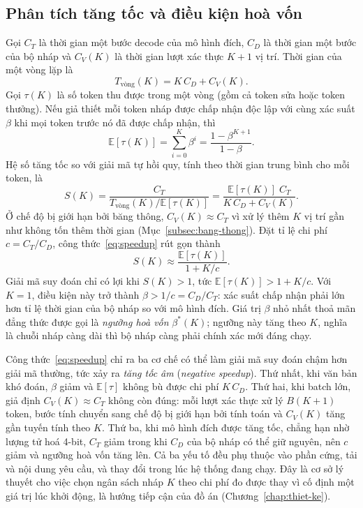 \subsection{Phân tích tăng tốc và điều kiện hoà vốn}
\label{subsec:phan-tich-tang-toc}

Gọi $C_T$ là thời gian một bước decode của mô hình đích, $C_D$ là thời gian một bước của bộ nháp và $C_V(K)$ là thời gian lượt xác thực $K+1$ vị trí. Thời gian của một vòng lặp là
\begin{equation}\label{eq:thoi-gian-vong}
  T_{\text{vòng}}(K) = K\,C_D + C_V(K).
\end{equation}
Gọi $\tau(K)$ là số token thu được trong một vòng (gồm cả token sửa hoặc token thưởng). Nếu giả thiết mỗi token nháp được chấp nhận độc lập với cùng xác suất $\beta$ khi mọi token trước nó đã được chấp nhận, thì~\cite{leviathan2023speculative}
\begin{equation}\label{eq:tau-ky-vong}
  \mathbb{E}[\tau(K)] = \sum_{i=0}^{K}\beta^{i} = \frac{1-\beta^{K+1}}{1-\beta}.
\end{equation}
Hệ số tăng tốc so với giải mã tự hồi quy, tính theo thời gian trung bình cho mỗi token, là
\begin{equation}\label{eq:speedup}
  S(K) = \frac{C_T}{T_{\text{vòng}}(K)/\mathbb{E}[\tau(K)]} = \frac{\mathbb{E}[\tau(K)]\; C_T}{K\,C_D + C_V(K)}.
\end{equation}
Ở chế độ bị giới hạn bởi băng thông, $C_V(K) \approx C_T$ vì xử lý thêm $K$ vị trí gần như không tốn thêm thời gian (Mục~\ref{subsec:bang-thong}). Đặt tỉ lệ chi phí $c = C_T/C_D$, công thức~\eqref{eq:speedup} rút gọn thành
\begin{equation}\label{eq:speedup-gon}
  S(K) \approx \frac{\mathbb{E}[\tau(K)]}{1 + K/c}.
\end{equation}
Giải mã suy đoán chỉ có lợi khi $S(K) > 1$, tức $\mathbb{E}[\tau(K)] > 1 + K/c$. Với $K=1$, điều kiện này trở thành $\beta > 1/c = C_D/C_T$: xác suất chấp nhận phải lớn hơn tỉ lệ thời gian của bộ nháp so với mô hình đích. Giá trị $\beta$ nhỏ nhất thoả mãn đẳng thức được gọi là \textit{ngưỡng hoà vốn} $\beta^\ast(K)$; ngưỡng này tăng theo $K$, nghĩa là chuỗi nháp càng dài thì bộ nháp càng phải chính xác mới đáng chạy.

Công thức~\eqref{eq:speedup} chỉ ra ba cơ chế có thể làm giải mã suy đoán chậm hơn giải mã thường, tức xảy ra \textit{tăng tốc âm} (\textit{negative speedup}). Thứ nhất, khi văn bản khó đoán, $\beta$ giảm và $\mathbb{E}[\tau]$ không bù được chi phí $K\,C_D$. Thứ hai, khi batch lớn, giả định $C_V(K)\approx C_T$ không còn đúng: mỗi lượt xác thực xử lý $B(K+1)$ token, bước tính chuyển sang chế độ bị giới hạn bởi tính toán và $C_V(K)$ tăng gần tuyến tính theo $K$. Thứ ba, khi mô hình đích được tăng tốc, chẳng hạn nhờ lượng tử hoá 4-bit, $C_T$ giảm trong khi $C_D$ của bộ nháp có thể giữ nguyên, nên $c$ giảm và ngưỡng hoà vốn tăng lên. Cả ba yếu tố đều phụ thuộc vào phần cứng, tải và nội dung yêu cầu, và thay đổi trong lúc hệ thống đang chạy. Đây là cơ sở lý thuyết cho việc chọn ngân sách nháp $K$ theo chi phí đo được thay vì cố định một giá trị lúc khởi động, là hướng tiếp cận của đồ án (Chương~\ref{chap:thiet-ke}).

